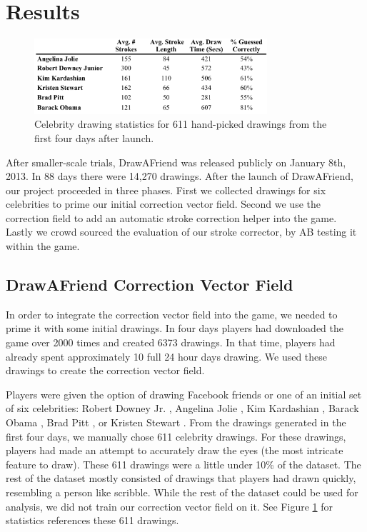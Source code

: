\section{Results}
\begin{figure}
  \centering%
\includegraphics[height=1.1in]{./figures/daf-stats-cropped.pdf}
  \caption{Celebrity drawing statistics for 611 hand-picked drawings from the first four days after launch.}
  \label{fig:daf-stats}
\end{figure}



After smaller-scale trials, DrawAFriend was released publicly on January 8th, 2013. In 88 days there were 14,270 drawings. After the launch of DrawAFriend, our project proceeded in three phases. First we collected drawings for six celebrities to prime our initial correction vector field. Second we use the correction field to add an automatic stroke correction helper into the game. Lastly we crowd sourced the evaluation of our stroke corrector, by AB testing it within the game.

\subsection{DrawAFriend Correction Vector Field}
In order to integrate the correction vector field into the game, we needed to prime it with some initial drawings. In four days players had downloaded the game over 2000 times and created 6373 drawings. In that time, players had already spent approximately 10 full 24 hour days drawing. We used these drawings to create the correction vector field.


Players were given the option of drawing Facebook friends or one of an initial set of six celebrities: Robert Downey Jr. \cite{iron}, Angelina Jolie \cite{angelina}, Kim Kardashian \cite{kim}, Barack Obama \cite{obama}, Brad Pitt \cite{brad}, or Kristen Stewart \cite{kristen}. From the drawings generated in the first four days, we manually chose 611 celebrity drawings. For these drawings, players had made an attempt to accurately draw the eyes (the most intricate feature to draw). These 611 drawings were a little under 10\% of the dataset. The rest of the dataset mostly consisted of drawings that players had drawn quickly, resembling a person like scribble. While the rest of the dataset could be used for analysis, we did not train our correction vector field on it.  See Figure \ref{fig:daf-stats}  for statistics references these 611 drawings.

